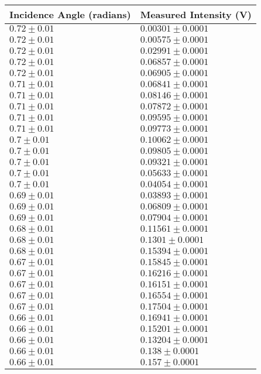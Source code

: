 \begin{tabular}{| p{} | p{} |}
\hline
Incidence Angle (radians) & Measured Intensity (V)\\
\hline
$0.72 \pm 0.01$ & $0.00301 \pm 0.0001$\\
$0.72 \pm 0.01$ & $0.00575 \pm 0.0001$\\
$0.72 \pm 0.01$ & $0.02991 \pm 0.0001$\\
$0.72 \pm 0.01$ & $0.06857 \pm 0.0001$\\
$0.72 \pm 0.01$ & $0.06905 \pm 0.0001$\\
$0.71 \pm 0.01$ & $0.06841 \pm 0.0001$\\
$0.71 \pm 0.01$ & $0.08146 \pm 0.0001$\\
$0.71 \pm 0.01$ & $0.07872 \pm 0.0001$\\
$0.71 \pm 0.01$ & $0.09595 \pm 0.0001$\\
$0.71 \pm 0.01$ & $0.09773 \pm 0.0001$\\
$0.7 \pm 0.01$ & $0.10062 \pm 0.0001$\\
$0.7 \pm 0.01$ & $0.09805 \pm 0.0001$\\
$0.7 \pm 0.01$ & $0.09321 \pm 0.0001$\\
$0.7 \pm 0.01$ & $0.05633 \pm 0.0001$\\
$0.7 \pm 0.01$ & $0.04054 \pm 0.0001$\\
$0.69 \pm 0.01$ & $0.03893 \pm 0.0001$\\
$0.69 \pm 0.01$ & $0.06809 \pm 0.0001$\\
$0.69 \pm 0.01$ & $0.07904 \pm 0.0001$\\
$0.68 \pm 0.01$ & $0.11561 \pm 0.0001$\\
$0.68 \pm 0.01$ & $0.1301 \pm 0.0001$\\
$0.68 \pm 0.01$ & $0.15394 \pm 0.0001$\\
$0.67 \pm 0.01$ & $0.15845 \pm 0.0001$\\
$0.67 \pm 0.01$ & $0.16216 \pm 0.0001$\\
$0.67 \pm 0.01$ & $0.16151 \pm 0.0001$\\
$0.67 \pm 0.01$ & $0.16554 \pm 0.0001$\\
$0.67 \pm 0.01$ & $0.17504 \pm 0.0001$\\
$0.66 \pm 0.01$ & $0.16941 \pm 0.0001$\\
$0.66 \pm 0.01$ & $0.15201 \pm 0.0001$\\
$0.66 \pm 0.01$ & $0.13204 \pm 0.0001$\\
$0.66 \pm 0.01$ & $0.138 \pm 0.0001$\\
$0.66 \pm 0.01$ & $0.157 \pm 0.0001$\\
\hline
\end{tabular}\\
